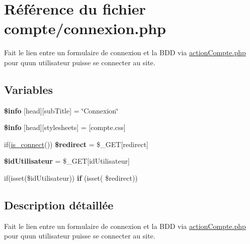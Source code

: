 \hypertarget{compte_2connexion_8php}{}\section{Référence du fichier compte/connexion.php}
\label{compte_2connexion_8php}


Fait le lien entre un formulaire de connexion et la B\+DD via \hyperlink{actionCompte_8php}{action\+Compte.\+php} pour qu\textquotesingle{}un utilisateur puisse se connecter au site.  


\subsection*{Variables}
\begin{DoxyCompactItemize}
\item 
\mbox{\label{compte_2connexion_8php_a024f87f9bf4f3b33710e2e7ff8f60823}} 
{\bfseries \$info} \mbox{[}\textquotesingle{}head\textquotesingle{}\mbox{]}\mbox{[}\textquotesingle{}sub\+Title\textquotesingle{}\mbox{]} = \char`\"{}Connexion\char`\"{}
\item 
\mbox{\label{compte_2connexion_8php_af6044c8bf78ebc8c58057e14d7738bbd}} 
{\bfseries \$info} \mbox{[}\textquotesingle{}head\textquotesingle{}\mbox{]}\mbox{[}\textquotesingle{}stylesheets\textquotesingle{}\mbox{]} = \mbox{[}\textquotesingle{}compte.\+css\textquotesingle{}\mbox{]}
\item 
\mbox{\label{compte_2connexion_8php_a9db522731216285f0de0c2339e39fcd6}} 
if(\hyperlink{fonctionCompte_8php_a2fe594e0482307b8729ea37780d6f74b}{is\+\_\+connect}()) {\bfseries \$redirect} = \$\+\_\+\+G\+ET\mbox{[}\textquotesingle{}redirect\textquotesingle{}\mbox{]}
\item 
\mbox{\label{compte_2connexion_8php_aef2ac477d895384d08de1ff55a1683db}} 
{\bfseries \$id\+Utilisateur} = \$\+\_\+\+G\+ET\mbox{[}\textquotesingle{}id\+Utilisateur\textquotesingle{}\mbox{]}
\item 
\mbox{\label{compte_2connexion_8php_acac70ffa3bb4297d17d710b6d843b740}} 
if(isset(\$id\+Utilisateur)) {\bfseries if} (isset( \$redirect))
\end{DoxyCompactItemize}


\subsection{Description détaillée}
Fait le lien entre un formulaire de connexion et la B\+DD via \hyperlink{actionCompte_8php}{action\+Compte.\+php} pour qu\textquotesingle{}un utilisateur puisse se connecter au site. 


